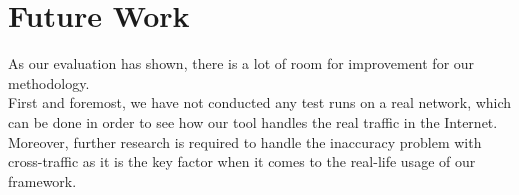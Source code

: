 \section{Future Work}
As our evaluation has shown, there is a lot of room for improvement for our methodology.\\
First and foremost, we have not conducted any test runs on a real network, which can be done in order to see how our tool handles the real traffic in the Internet.\\
Moreover, further research is required to handle the inaccuracy problem with cross-traffic as it is the key factor when it comes to the real-life usage of our framework.\\
